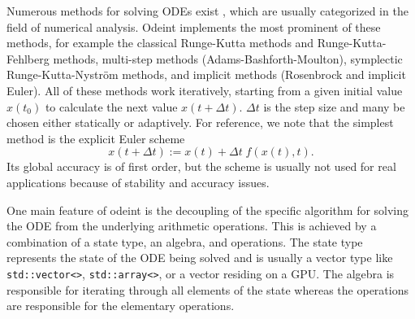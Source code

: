 \documentclass[final]{siamltex}
\newcommand{\code}[1]{\lstinline|#1|}
\begin{document}
Numerous methods for solving ODEs exist \cite{Press-92,HairerSolvingODEI,
  HairerSolvingODEII}, %
which are usually categorized in the field of numerical analysis.
Odeint
implements the most prominent of these methods, for example the
classical Runge-Kutta methods and Runge-Kutta-Fehlberg methods,
multi-step methods (Adams-Bashforth-Moulton), symplectic
Runge-Kutta-Nystr\"om methods, and implicit methods (Rosenbrock and
implicit Euler). All of these methods work iteratively, starting
from a given initial value $x(t_0)$ to calculate the next value
$x(t+\Delta t)$.
$\Delta t$ is the step size and many be chosen either statically or adaptively.
For reference, we note that the simplest method is the explicit Euler scheme
\begin{equation}
x\left(t+\Delta t\right) := x(t) + \Delta t \; f(x(t),t) .
\label{eq:euler}
\end{equation}
Its global accuracy is of first order, but the scheme is usually not
used for real applications because of stability and accuracy issues.


One main feature of odeint is the decoupling of the specific algorithm
for solving the ODE from the underlying arithmetic operations. This
is achieved by a combination of a state type, an algebra, and
operations. The state type represents the state of the ODE being
solved and is usually a vector type like \code{std::vector<>},
\code{std::array<>}, or a vector residing on a GPU. The algebra is
responsible for iterating through all elements of the state whereas
the operations are responsible for the elementary operations.
\end{document}
